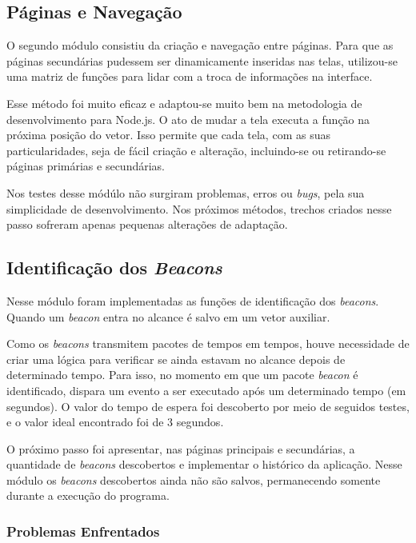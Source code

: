 \subsection{Páginas e Navegação}\label{sec:segundo-modulo}

O segundo módulo consistiu da criação e navegação entre páginas. Para que as páginas secundárias pudessem ser dinamicamente inseridas nas telas, utilizou-se uma matriz de funções para lidar com a troca de informações na interface. 

Esse método foi muito eficaz e adaptou-se muito bem na metodologia de desenvolvimento para Node.js. O ato de mudar a tela executa a função na próxima posição do vetor. Isso permite que cada tela, com as suas particularidades, seja de fácil criação e alteração, incluindo-se ou retirando-se páginas primárias e secundárias.

Nos testes desse módúlo não surgiram problemas, erros ou \textit{bugs}, pela sua simplicidade de desenvolvimento. Nos próximos métodos, trechos criados nesse passo sofreram apenas pequenas alterações de adaptação.

\subsection{Identificação dos \textit{Beacons}}\label{sec:terceiro-modulo}

Nesse módulo foram implementadas as funções de identificação dos \textit{beacons}. Quando um \textit{beacon} entra no alcance é salvo em um vetor auxiliar. 

Como os \textit{beacons} transmitem pacotes de tempos em tempos, houve necessidade de criar uma lógica para verificar se ainda estavam no alcance depois de determinado tempo. Para isso, no momento em que um pacote \textit{beacon} é identificado, dispara um evento a ser executado após um determinado tempo (em segundos). O valor do tempo de espera foi descoberto por meio de seguidos testes, e o valor ideal encontrado foi de 3 segundos.

O próximo passo foi apresentar, nas páginas principais e secundárias, a quantidade de \textit{beacons} descobertos e implementar o histórico da aplicação. Nesse módulo os \textit{beacons} descobertos ainda não são salvos, permanecendo somente durante a execução do programa.

\subsubsection{Problemas Enfrentados}\label{sec:problema-quarto-modulo}

